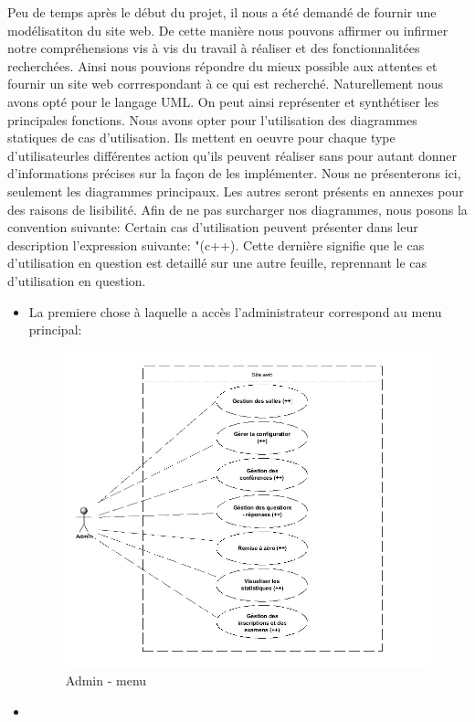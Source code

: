 Peu de temps après le début du projet, il nous a été demandé de fournir une modélisatiton du site web. De cette manière
nous pouvons affirmer ou infirmer notre compréhensions vis à vis du travail à réaliser et des fonctionnalitées recherchées.
Ainsi nous pouvions répondre du mieux possible aux attentes et fournir un site web corrrespondant à ce qui est recherché.
Naturellement nous avons opté pour le langage UML. On peut ainsi représenter et synthétiser les principales fonctions. Nous avons opter
pour l'utilisation des diagrammes statiques de cas d'utilisation. Ils mettent en oeuvre pour chaque type d'utilisateurles différentes action 
qu'ils peuvent réaliser sans pour autant donner d'informations précises sur la façon de les implémenter.
Nous ne présenterons ici, seulement les diagrammes principaux. Les autres seront présents en annexes pour des raisons de lisibilité.
Afin de ne pas surcharger nos diagrammes, nous posons la convention suivante: Certain cas d'utilisation peuvent présenter 
dans leur description l'expression suivante: "(c++). Cette dernière signifie que le cas d'utilisation en question est detaillé sur une autre feuille, 
reprennant le cas d'utilisation en question.
\begin{itemize}
\item La premiere chose à laquelle a accès l'administrateur correspond au menu principal:
 \begin{figure}[h]
        \begin{center}
            \includegraphics[scale=0.6]{images/Admin - menu1.jpg} 
        \end{center}

        \caption{Admin - menu}
        \label{Admin - menu}
    \end{figure}
\item 
\end{itemize}
\newpage
 
